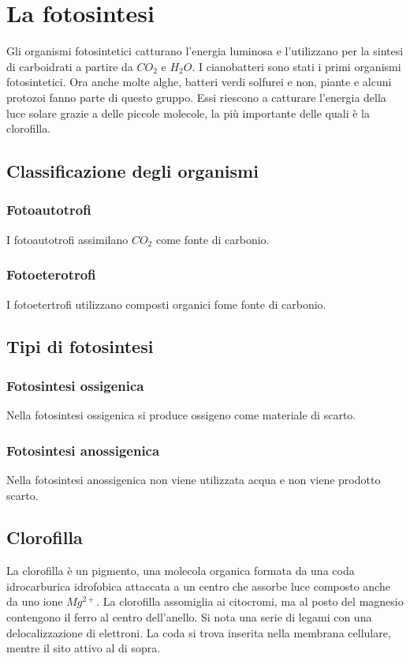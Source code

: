 \section{La fotosintesi}
Gli organismi fotosintetici catturano l'energia luminosa e l'utilizzano per la sintesi di carboidrati a partire da \emph{$CO_2$} e \emph{$H_2O$}. 
I cianobatteri sono stati i primi organismi fotosintetici. 
Ora anche molte alghe, batteri verdi solfurei e non, piante e alcuni protozoi fanno parte di questo gruppo. 
Essi riescono a catturare l'energia della luce solare grazie a delle piccole molecole, la pi\`u importante delle quali \`e la clorofilla. 

	\subsection{Classificazione degli organismi}

		\subsubsection{Fotoautotrofi}
		I fotoautotrofi assimilano \emph{$CO_2$} come fonte di carbonio.

		\subsubsection{Fotoeterotrofi}
		I fotoetertrofi utilizzano composti organici fome fonte di carbonio.

	\subsection{Tipi di fotosintesi}

		\subsubsection{Fotosintesi ossigenica}
		Nella fotosintesi ossigenica si produce ossigeno come materiale di scarto.

		\subsubsection{Fotosintesi anossigenica}
		Nella fotosintesi anossigenica non viene utilizzata acqua e non viene prodotto scarto.

	\subsection{Clorofilla}
	La clorofilla \`e un pigmento, una molecola organica formata da una coda idrocarburica idrofobica attaccata a un centro che assorbe luce composto anche da uno ione \emph{$Mg^{2+}$}. 
	La clorofilla assomiglia ai citocromi, ma al posto del magnesio contengono il ferro al centro dell'anello. 
	Si nota una serie di legami con una delocalizzazione di elettroni.
	La coda si trova inserita nella membrana cellulare, mentre il sito attivo al di sopra.
	
